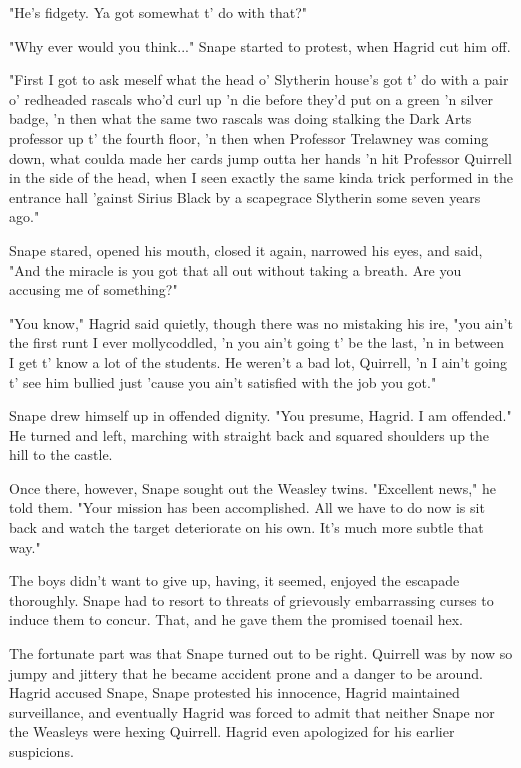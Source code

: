 "He's fidgety. Ya got somewhat t' do with that?"

"Why ever would you think..." Snape started to protest, when Hagrid cut him off.

"First I got to ask meself what the head o' Slytherin house's got t' do with a pair o' redheaded rascals who'd curl up 'n die before they'd put on a green 'n silver badge, 'n then what the same two rascals was doing stalking the Dark Arts professor up t' the fourth floor, 'n then when Professor Trelawney was coming down, what coulda made her cards jump outta her hands 'n hit Professor Quirrell in the side of the head, when I seen exactly the same kinda trick performed in the entrance hall 'gainst Sirius Black by a scapegrace Slytherin some seven years ago."

Snape stared, opened his mouth, closed it again, narrowed his eyes, and said, "And the miracle is you got that all out without taking a breath. Are you accusing me of something?"

"You know," Hagrid said quietly, though there was no mistaking his ire, "you ain't the first runt I ever mollycoddled, 'n you ain't going t' be the last, 'n in between I get t' know a lot of the students. He weren't a bad lot, Quirrell, 'n I ain't going t' see him bullied just 'cause you ain't satisfied with the job you got."

Snape drew himself up in offended dignity. "You presume, Hagrid. I am offended." He turned and left, marching with straight back and squared shoulders up the hill to the castle.

Once there, however, Snape sought out the Weasley twins. "Excellent news," he told them. "Your mission has been accomplished. All we have to do now is sit back and watch the target deteriorate on his own. It's much more subtle that way."

The boys didn't want to give up, having, it seemed, enjoyed the escapade thoroughly. Snape had to resort to threats of grievously embarrassing curses to induce them to concur. That, and he gave them the promised toenail hex.

The fortunate part was that Snape turned out to be right. Quirrell was by now so jumpy and jittery that he became accident prone and a danger to be around. Hagrid accused Snape, Snape protested his innocence, Hagrid maintained surveillance, and eventually Hagrid was forced to admit that neither Snape nor the Weasleys were hexing Quirrell. Hagrid even apologized for his earlier suspicions.

